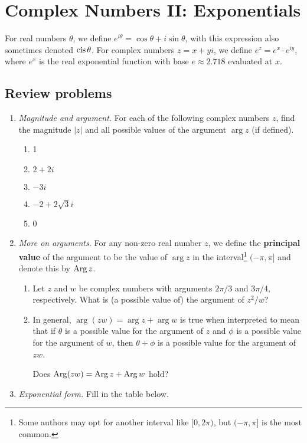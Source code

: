 \section{Complex Numbers II: Exponentials}

For real numbers $\theta$, we define $e^{i\theta} = \cos\theta + i\sin\theta$, with this expression also sometimes denoted $\operatorname{cis}\theta$. For complex numbers $z = x + yi$, we define $e^z = e^x\cdot e^{iy}$, where $e^x$ is the real exponential function with base $e\approx 2.718$ evaluated at $x$.

\subsection{Review problems}

\begin{enumerate}
\item \emph{Magnitude and argument.} For each of the following complex numbers $z$, find the magnitude $\lvert z\rvert$ and all possible values of the argument $\arg z$ (if defined).
\begin{enumerate}
\item 1
\item $2 + 2i$
\item $-3i$
\item $-2 + 2\sqrt{3}i$
\item 0
\end{enumerate}
\item \emph{More on arguments.} For any non-zero real number $z$, we define the \textbf{principal value} of the argument to be the value of $\arg z$ in the interval\footnote{Some authors may opt for another interval like $[0,2\pi)$, but $(-\pi,\pi]$ is the most common.} $(-\pi,\pi]$ and denote this by $\operatorname{Arg} z$.
\begin{enumerate}
\item Let $z$ and $w$ be complex numbers with arguments $2\pi/3$ and $3\pi/4$, respectively. What is (a possible value of) the argument of $z^2/w$?
\item In general, $\arg(zw) = \arg z + \arg w$ is true when interpreted to mean that if $\theta$ is a possible value for the argument of $z$ and $\phi$ is a possible value for the argument of $w$, then $\theta + \phi$ is a possible value for the argument of $zw$.\par
Does $\operatorname{Arg}(zw) = \operatorname{Arg} z + \operatorname{Arg} w$ hold?
\end{enumerate}
\item \emph{Exponential form.} Fill in the table below.

\end{enumerate}

